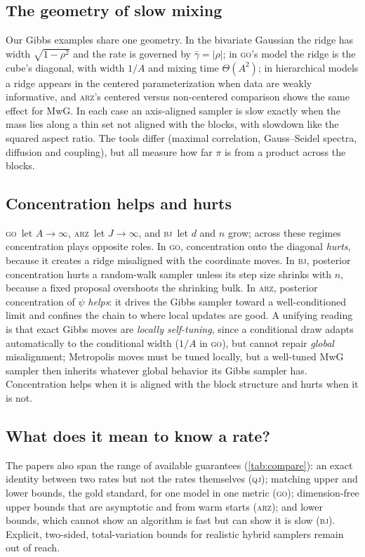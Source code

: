 \documentclass[11pt]{article}
\theoremstyle{remark}
\newcommand{\QJ}{\textsc{qj}}
\newcommand{\ARZ}{\textsc{arz}}
\newcommand{\GO}{\textsc{go}}
\newcommand{\BJ}{\textsc{bj}}
\begin{document}
\subsection{The geometry of slow mixing}
Our Gibbs examples share one geometry. In the bivariate Gaussian the ridge has width $\sqrt{1-\rho^2}$ and the rate is governed by $\bar\gamma=|\rho|$; in \GO's model the ridge is the cube's diagonal, with width $1/A$ and mixing time $\Theta(A^2)$; in hierarchical models a ridge appears in the centered parameterization when data are weakly informative, and \ARZ's centered versus non-centered comparison shows the same effect for MwG. In each case an axis-aligned sampler is slow exactly when the mass lies along a thin set not aligned with the blocks, with slowdown like the squared aspect ratio. The tools differ (maximal correlation, Gauss--Seidel spectra, diffusion and coupling), but all measure how far $\pi$ is from a product across the blocks.

\subsection{Concentration helps and hurts}
\GO\ let $A\to\infty$, \ARZ\ let $J\to\infty$, and \BJ\ let $d$ and $n$ grow; across these regimes concentration plays opposite roles. In \GO, concentration onto the diagonal \emph{hurts}, because it creates a ridge misaligned with the coordinate moves. In \BJ, posterior concentration hurts a random-walk sampler unless its step size shrinks with $n$, because a fixed proposal overshoots the shrinking bulk. In \ARZ, posterior concentration of $\psi$ \emph{helps}: it drives the Gibbs sampler toward a well-conditioned limit and confines the chain to where local updates are good. A unifying reading is that exact Gibbs moves are \emph{locally self-tuning}, since a conditional draw adapts automatically to the conditional width ($1/A$ in \GO), but cannot repair \emph{global} misalignment; Metropolis moves must be tuned locally, but a well-tuned MwG sampler then inherits whatever global behavior its Gibbs sampler has. Concentration helps when it is aligned with the block structure and hurts when it is not.

\subsection{What does it mean to know a rate?}
The papers also span the range of available guarantees (\cref{tab:compare}): an exact identity between two rates but not the rates themselves (\QJ); matching upper and lower bounds, the gold standard, for one model in one metric (\GO); dimension-free upper bounds that are asymptotic and from warm starts (\ARZ); and lower bounds, which cannot show an algorithm is fast but can show it is slow (\BJ). Explicit, two-sided, total-variation bounds for realistic hybrid samplers remain out of reach.
\end{document}
